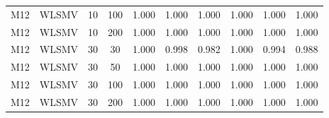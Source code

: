 {\begin{longtable}[!tbp]{@{\extracolsep{\fill}}lccccccccc}
  M12 & WLSMV & 10 & 100 & 1.000 & 1.000 & 1.000 & 1.000 & 1.000 & 1.000 \\ 
  M12 & WLSMV & 10 & 200 & 1.000 & 1.000 & 1.000 & 1.000 & 1.000 & 1.000 \\ 
  M12 & WLSMV & 30 & 30 & 1.000 & 0.998 & 0.982 & 1.000 & 0.994 & 0.988 \\ 
  M12 & WLSMV & 30 & 50 & 1.000 & 1.000 & 1.000 & 1.000 & 1.000 & 1.000 \\ 
  M12 & WLSMV & 30 & 100 & 1.000 & 1.000 & 1.000 & 1.000 & 1.000 & 1.000 \\ 
  M12 & WLSMV & 30 & 200 & 1.000 & 1.000 & 1.000 & 1.000 & 1.000 & 1.000\\
\end{longtable}
}